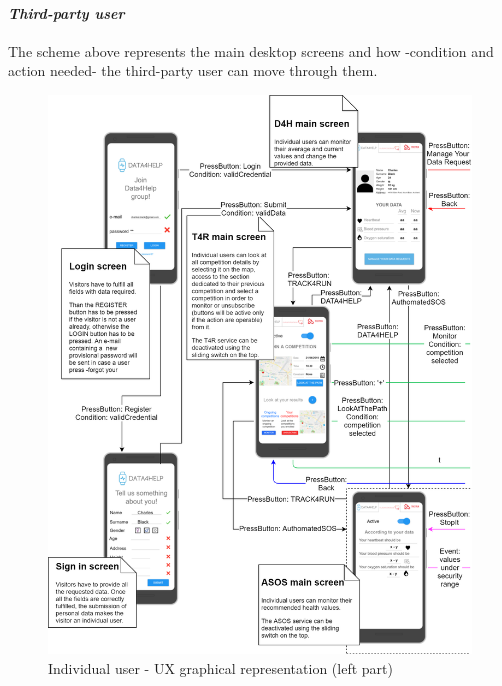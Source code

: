 \paragraph{\textit{Third-party user}} The scheme above represents the main desktop screens and how -condition and action needed- the third-party user can move through them.
\begin{figure}[H]
\caption{Individual user - UX graphical representation (left part)}
\includegraphics[width = \textwidth]{sections/userInterfacesGraphs/UserExperienceScreenSX.png}
\end{figure}
